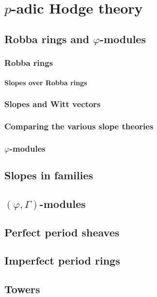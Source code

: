 \chapter{\texorpdfstring{$p$}{}-adic Hodge theory}
    \begin{abstract}
        
    \end{abstract}
    
    \minitoc
    
    \section{Robba rings and \texorpdfstring{$\varphi$}{}-modules}
        \subsection{Robba rings}
            \subsubsection{Slopes over Robba rings}
                
            \subsection{Slopes and Witt vectors}
            
            \subsection{Comparing the various slope theories}
        
        \subsection{\texorpdfstring{$\varphi$}{}-modules}
        
    \section{Slopes in families}
    
    \section{\texorpdfstring{$(\varphi, \Gamma)$}{}-modules}
    
    \section{Perfect period sheaves}
    
    \section{Imperfect period rings}
    
    \section{Towers}